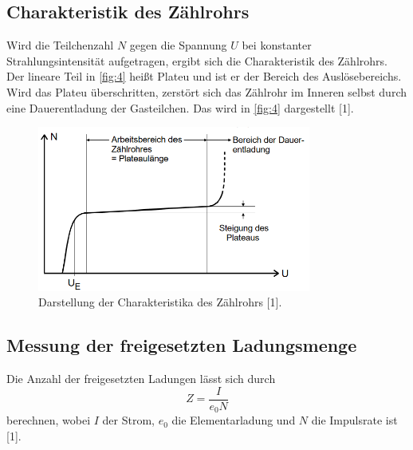 \subsection{Charakteristik des Zählrohrs}
Wird die Teilchenzahl $N$ gegen die Spannung $U$ bei konstanter Strahlungsintensität aufgetragen, ergibt sich die Charakteristik des Zählrohrs. Der lineare Teil in \autoref{fig:4} heißt Plateu und ist er der Bereich des Auslösebereichs. Wird das Plateu überschritten, zerstört sich das Zählrohr im Inneren selbst durch eine Dauerentladung der Gasteilchen. Das wird in \autoref{fig:4} dargestellt [1].
\begin{figure}[H] 
  \centering 
  \includegraphics[width=9cm]{4} 
  \caption{Darstellung der Charakteristika des Zählrohrs [1].} 
  \label{fig:4} 
\end{figure}

\subsection{Messung der freigesetzten Ladungsmenge}
Die Anzahl der freigesetzten Ladungen lässt sich durch 
\begin{equation}
  Z=\frac{I}{e_0 N}
  \label{eq:3}
\end{equation}
berechnen, wobei $I$ der Strom, $e_0$ die Elementarladung und $N$ die Impulsrate ist [1]. 
